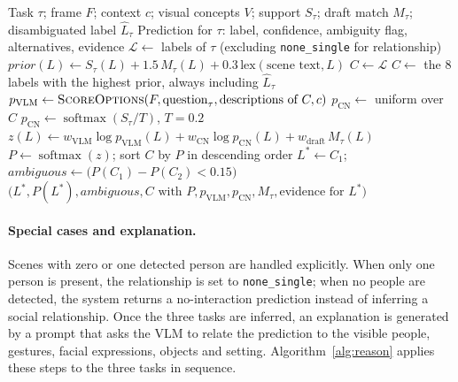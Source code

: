 \documentclass[12pt,a4paper,oneside]{report}
\newcommand{\code}[1]{\texttt{#1}}
\begin{document}
\begin{algorithm}[htbp]
\caption{Inference of one task with log-linear fusion}
\label{alg:infertask}
\begin{algorithmic}[1]
\Require Task $\tau$; frame $F$; context $c$; visual concepts $V$; support $S_\tau$; draft match $M_\tau$; disambiguated label $\hat{L}_\tau$
\Ensure Prediction for $\tau$: label, confidence, ambiguity flag, alternatives, evidence
\State $\mathcal{L} \gets$ labels of $\tau$ (excluding \code{none\_single} for relationship)
  \State $\mathit{prior}(L) \gets S_\tau(L) + 1.5\, M_\tau(L) + 0.3\, \mathrm{lex}(\text{scene text}, L)$
\EndFor
{}
  \State $C \gets \mathcal{L}$ 
\Else
  \State $C \gets$ the 8 labels with the highest prior, always including $\hat{L}_\tau$
\EndIf
\State $p_{\text{VLM}} \gets \textsc{ScoreOptions}(F, \text{question}_\tau, \text{descriptions of } C, c)$ 
  \State $p_{\text{CN}} \gets$ uniform over $C$
\Else
  \State $p_{\text{CN}} \gets \operatorname{softmax}(S_\tau / T)$, $T = 0.2$
\EndIf
{}
  \State $z(L) \gets w_{\text{VLM}} \log p_{\text{VLM}}(L) + w_{\text{CN}} \log p_{\text{CN}}(L) + w_{\text{draft}}\, M_\tau(L)$
\EndFor
\State $P \gets \operatorname{softmax}(z)$; sort $C$ by $P$ in descending order
\State $L^* \gets C_1$;\; $\mathit{ambiguous} \gets \big(P(C_1) - P(C_2) < 0.15\big)$
\State \Return $\big(L^*, P(L^*), \mathit{ambiguous}, C \text{ with } P, p_{\text{VLM}}, p_{\text{CN}}, M_\tau, \text{evidence for } L^*\big)$
\end{algorithmic}
\end{algorithm}

\paragraph{Special cases and explanation.} Scenes with zero or one detected
person are handled explicitly. When only one person is present, the relationship
is set to \code{none\_single}; when no people are detected, the system returns
a no-interaction prediction instead of inferring a social relationship. Once the
three tasks are inferred, an explanation is generated by a prompt that asks the
VLM to relate the prediction to the visible people, gestures, facial
expressions, objects and setting. Algorithm~\ref{alg:reason} applies these steps
to the three tasks in sequence.
\end{document}
